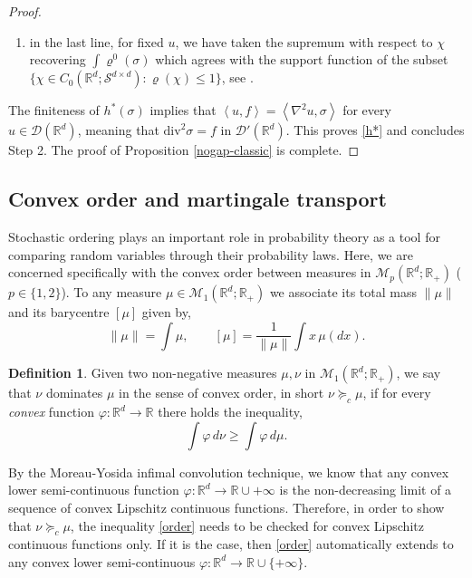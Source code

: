 \documentclass[11pt,letterpaper,reqno]{amsart}
\theoremstyle{definition}
\newtheorem{definition}[theorem]{Definition}
\newtheorem{remark}[theorem]{Remark}
\numberwithin{equation}{section}
\newcommand{\R}{\mathbb{R}}
\newcommand{\Rd}{\R^d}
\newcommand{\Mes}{{\mathcal{M}}}
\newcommand{\dive}{{\mathrm{div}}}
\newcommand{\pairing}[1]{{\left \langle #1 \right \rangle}}
\newcommand{\D}{\mathcal{D}}
\newcommand{\Sdd}{{\mathcal{S}^{d \times d}}}
\begin{document}
\begin{proof}
\begin{enumerate}
\item [-]  in the last line, for fixed $u$, we have taken the supremum with respect to $\chi$ recovering $\int \varrho^0(\sigma)$ which agrees with the support function of  the subset $\{\chi \in C_0(\R^d;\Sdd) : \varrho(\chi)\le 1\}$, see \cite{bouchitte1988}.
\end{enumerate}
The finiteness of $h^*(\sigma)$ implies that $\pairing{u,f}= \pairing{\nabla^2u, \sigma}$ for every $u\in \D(\R^d)$, meaning that
$\dive^2 \sigma= f$ in $\D'(\Rd)$. This proves  \eqref{h*} and concludes Step 2.
The proof of Proposition \ref{nogap-classic} is complete.
\end{proof}





\subsection{Convex order and martingale transport}\label{MTsurv} Stochastic ordering plays an important role in probability theory as a tool for comparing random variables through their probability laws. 
 Here, we are concerned specifically with the convex order between measures in $\Mes_p(\R^d;\R_+)$ ($p\in \{1,2\}$).
 To any measure $\mu\in \Mes_1(\Rd;\R_+)$ we associate its total mass $\|\mu\|$ and its barycentre $[\mu]$ given by,
$$   \|\mu\| = \int  \mu, \qquad [\mu]=  \frac1{\|\mu\|} \int x \, \mu(dx).$$
 
 \begin{definition}\label{def:convexorder} Given  two non-negative measures $\mu,\nu$ in  $\Mes_1(\R^d;\R_+)$,  we say that $\nu$ dominates $\mu$ in the sense of convex order, in short  $\nu  \succeq_c \mu$,  if for every \emph{convex} function $\varphi:\R^d \to \R$ there holds the inequality,
\begin{equation}\label{order}
\int \varphi\, d\nu \ge \int  \varphi\, d\mu .
 \end{equation}
 \end{definition}
 By the  Moreau-Yosida infimal convolution technique, we know that any convex lower semi-continuous function 
 $\varphi: \R^d \to \R \cup {+\infty}$ is the non-decreasing limit 
 of a sequence of convex Lipschitz continuous functions. 
 Therefore, in order to show that $\nu  \succeq_c \mu$,  the inequality \eqref{order} needs to be checked  for  convex Lipschitz continuous functions  only. If it is the case, then  \eqref{order} automatically extends to any convex lower semi-continuous $\varphi: \R^d \to \R\cup \{+\infty\}$.
\end{document}
